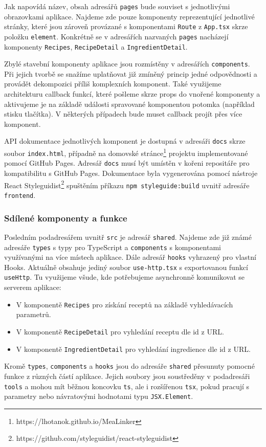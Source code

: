 Jak napovídá název, obsah adresářů \texttt{pages} bude souviset s jednotlivými obrazovkami aplikace. Najdeme zde pouze komponenty reprezentující jednotlivé stránky, které jsou zároveň provázané s komponentami \texttt{Route} z \texttt{App.tsx} skrze položku \texttt{element}. Konkrétně se v adresářích nazvaných \texttt{pages} nacházejí komponenty \texttt{Recipes}, \texttt{RecipeDetail} a \texttt{IngredientDetail}.

Zbylé stavební komponenty aplikace jsou rozmístěny v adresářích \texttt{components}. Při jejich tvorbě se snažíme uplatňovat již zmíněný princip jedné odpovědnosti a provádět dekompozici příliš komplexních komponent. Také využijeme architekturu callback funkcí, které pošleme skrze props do vnořené komponenty a aktivujeme je na základě události spravované komponentou potomka (například stisku tlačítka). V některých případech bude muset callback projít přes více komponent.

API dokumentace jednotlivých komponent je dostupná v adresáři \texttt{docs} skrze soubor \texttt{index.html}, případně na domovské stránce\footnote{https://lhotanok.github.io/MeaLinker} projektu implementované pomocí GitHub Pages. Adresář \texttt{docs} musí být umístěn v kořeni repositáře pro kompatibilitu s GitHub Pages. Dokumentace byla vygenerována pomocí nástroje React Styleguidist\footnote{https://github.com/styleguidist/react-styleguidist} spuštěním příkazu \texttt{npm styleguide:build} uvnitř adresáře \texttt{frontend}.

\subsubsection{Sdílené komponenty a funkce}

Posledním podadresářem uvnitř \texttt{src} je adresář \texttt{shared}. Najdeme zde již zná\-mé adresáře \texttt{types} s typy pro TypeScript a \texttt{components} s komponentami využívanými na více místech aplikace. Dále adresář \texttt{hooks} vyhrazený pro vlastní Hooks. Aktuálně obsahuje jediný soubor \texttt{use-http.tsx} s exportovanou funkcí \texttt{useHttp}. Tu využijeme všude, kde potřebujeme asynchronně komunikovat se serverem aplikace: 
\begin{itemize}
    \item V komponentě \texttt{Recipes} pro získání receptů na základě vyhledávacích parametrů.
    \item V komponentě \texttt{RecipeDetail} pro vyhledání receptu dle id z URL.
    \item V komponentě \texttt{IngredientDetail} pro vyhledání ingredience dle id z URL.
\end{itemize}
Kromě \texttt{types}, \texttt{components} a \texttt{hooks} jsou do adresáře \texttt{shared} přesunuty pomocné funkce z různých částí aplikace. Jejich soubory jsou soustředěny v podadresáři \texttt{tools} a mohou mít běžnou koncovku \texttt{ts}, ale i rozšířenou \texttt{tsx}, pokud pracují s parametry nebo návratovými hodnotami typu \texttt{JSX.Element}.

